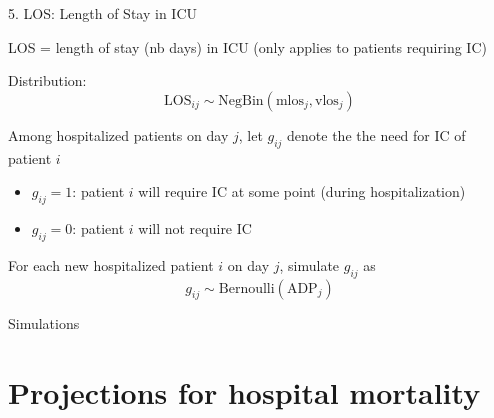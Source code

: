 \documentclass[t,9pt,xcolor=dvipsnames]{beamer}              %
\begin{document}
\begin{frame}{5. LOS: Length of Stay in ICU}

LOS = length of stay (nb days) in ICU (only applies to patients requiring IC)

Distribution:
\begin{equation*}
\text{LOS}_{ij} \sim \text{NegBin}\left(\text{mlos}_{j}, \text{vlos}_{j}\right)
\end{equation*}



\alert{Among hospitalized patients on day $j$}, let $g_{ij}$ denote the the need for IC of patient $i$
\begin{itemize}
\item $g_{ij}=1$: patient $i$ will require IC at some point (during hospitalization)
\item $g_{ij}=0$: patient $i$ will not require IC
\end{itemize}

For each new hospitalized patient $i$ on day $j$, simulate $g_{ij}$ as
\begin{equation*}
g_{ij} \sim \text{Bernoulli}\left(\text{ADP}_{j}\right)
\end{equation*} 

\note{
\tiny
\justifying

}
\end{frame}

\begin{frame}{Simulations}



\note{
\tiny
\justifying

}
\end{frame}

\section{Projections for hospital mortality}
\note{
\tiny
\justifying

}
\end{document}
